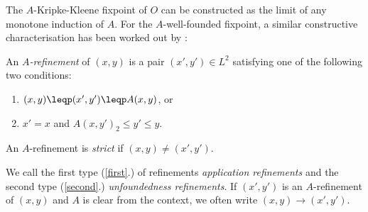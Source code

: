 % 
% 
The $A$-Kripke-Kleene fixpoint of $O$ can be constructed as the limit of any monotone induction of $A$. 
For the $A$-well-founded fixpoint, a similar constructive characterisation has been worked out by \citet{lpnmr/DeneckerV07}:
 

\begin{definition}\label{002:def:refinement}
An \emph{$A$-refinement} of $(x,y)$ is a pair $(x',y')\in L^2$ satisfying one of the following two conditions:
\begin{enumerate}
	\item $(x,y)\leqp(x',y')\leqp A(x,y)$, or \label{first}
	\item $x'=x$ and  $A(x,y')_2\leq y'\leq y$. \label{second}
\end{enumerate}
An $A$-refinement is \emph{strict} if $(x,y)\neq (x',y')$.
\end{definition}

We call the first type (\ref{first}.) of refinements \emph{application refinements} and the second type (\ref{second}.) \emph{unfoundedness refinements}. If $(x',y')$ is an $A$-refinement of $(x,y)$ and $A$ is clear from the context, we often write $(x,y)\to(x',y')$.
%


